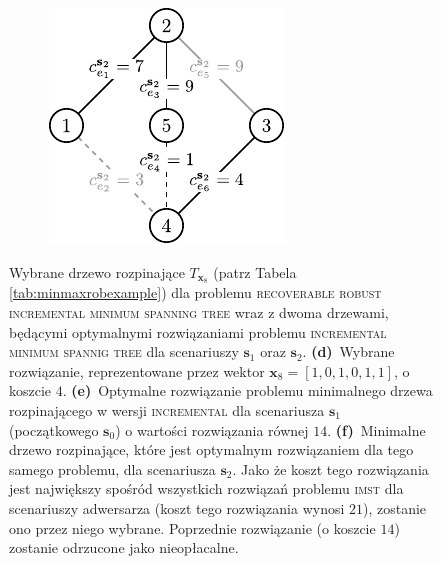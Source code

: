 \begin{figure}[!htbp]
\begin{subfigure}[b]{0.3\textwidth}
		\caption{}
		\label{fig:robincrexample:e}
	\end{subfigure}
	\hfill
	\begin{subfigure}[b]{0.3\textwidth}
		\includegraphics[width=\textwidth]{Chapter_II/ROB-INC-MST-example/c2}
		\caption{}
		\label{fig:robincrexample:f}
	\end{subfigure}
	\hfill\null
	\caption{
		Wybrane drzewo rozpinające $T_{\textbf{x}_{8}}$ (patrz Tabela \ref{tab:minmaxrobexample}) dla problemu \textsc{recoverable robust incremental minimum spanning tree} wraz z dwoma drzewami, będącymi optymalnymi rozwiązaniami problemu \textsc{incremental minimum spannig tree} dla scenariuszy $\textbf{s}_{1}$ oraz $\textbf{s}_{2}$.
		\textbf{(d)}~Wybrane rozwiązanie, reprezentowane przez wektor $\textbf{x}_{8} = \left[ 1, 0, 1, 0, 1, 1 \right]$, o koszcie $4$.
		\textbf{(e)}~Optymalne rozwiązanie problemu minimalnego drzewa rozpinającego w wersji \textsc{incremental} dla scenariusza $\textbf{s}_{1}$ (początkowego $\textbf{s}_{0}$) o wartości rozwiązania równej $14$.
		\textbf{(f)}~Minimalne drzewo rozpinające, które jest optymalnym rozwiązaniem dla tego samego problemu, dla scenariusza $\textbf{s}_{2}$. Jako że koszt tego rozwiązania jest największy spośród wszystkich rozwiązań problemu \textsc{imst} dla scenariuszy adwersarza (koszt tego rozwiązania wynosi $21$), zostanie ono przez niego wybrane. Poprzednie rozwiązanie (o koszcie $14$) zostanie odrzucone jako nieopłacalne.
	}
	\label{fig:robincrexample}
\end{figure}
